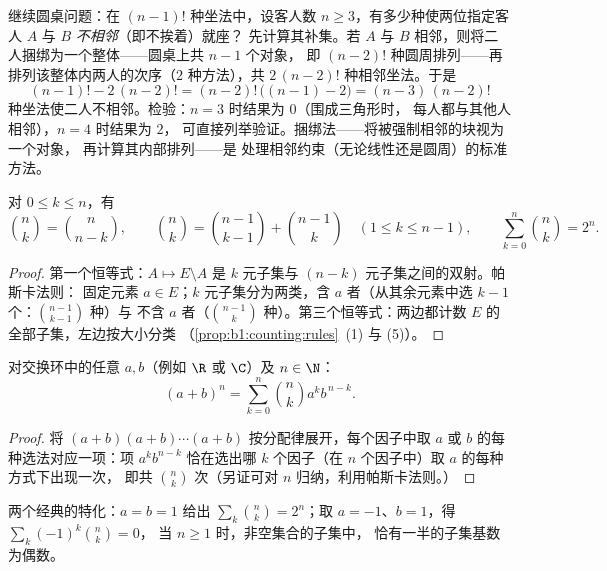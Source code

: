 \begin{example}[增加约束]\label{ex:b1:counting:constraint}
继续圆桌问题：在 $(n-1)!$ 种坐法中，设客人数 $n \geq
3$，有多少种使两位指定客人 $A$ 与 $B$ \emph{不相邻}（即不挨着）就座？
先计算其补集。若 $A$ 与 $B$
相邻，则将二人捆绑为一个整体——圆桌上共 $n - 1$ 个对象，
即 $(n-2)!$ 种圆周排列——再
排列该整体内两人的次序（$2$ 种方法），共 $2\,(n-2)!$
种相邻坐法。于是
\[
(n-1)! - 2\,(n-2)! = (n-2)!\,\bigl((n - 1) - 2\bigr)
= (n-3)\,(n-2)!
\]
种坐法使二人不相邻。检验：$n = 3$ 时结果为 $0$（围成三角形时，
每人都与其他人相邻），$n = 4$ 时结果为 $2$，
可直接列举验证。捆绑法——将被强制相邻的块视为一个对象，
再计算其内部排列——是
处理相邻约束（无论线性还是圆周）的标准方法。
\end{example}

\begin{proposition}[基本恒等式]\label{prop:b1:counting:identities}
对 $0 \leq k \leq n$，有
\[
\binom{n}{k} = \binom{n}{n-k},
\qquad
\binom{n}{k} = \binom{n-1}{k-1} + \binom{n-1}{k}
\quad (1 \leq k \leq n-1),
\qquad
\sum_{k=0}^{n} \binom{n}{k} = 2^n .
\]
\end{proposition}

\begin{proof}
第一个恒等式：$A \mapsto E \setminus A$ 是
$k$ 元子集与 $(n-k)$ 元子集之间的双射。帕斯卡法则：
固定元素 $a \in E$；$k$ 元子集分为两类，含
$a$ 者（从其余元素中选 $k - 1$ 个：$\binom{n-1}{k-1}$ 种）与
不含 $a$ 者（$\binom{n-1}{k}$ 种）。第三个恒等式：两边都计数
$E$ 的全部子集，左边按大小分类
（\cref{prop:b1:counting:rules}~(1) 与 (5)）。
\end{proof}

\begin{theorem}[二项式定理]\label{thm:b1:counting:binomial}
对交换环中的任意 $a, b$（例如 $\R$ 或 $\C$）及 $n \in \N$：
\[
(a + b)^n = \sum_{k=0}^{n} \binom{n}{k} a^k b^{\,n-k} .
\]
\end{theorem}

\begin{proof}
将 $(a+b)(a+b)\cdots(a+b)$ 按分配律展开，每个因子中取 $a$ 或 $b$
的每种选法对应一项：项 $a^k b^{n-k}$
恰在选出哪 $k$ 个因子（在 $n$ 个因子中）取 $a$ 的每种方式下出现一次，
即共 $\binom nk$ 次（另证可对
$n$ 归纳，利用帕斯卡法则。）
\end{proof}

\begin{example}\label{ex:b1:counting:binomial}
两个经典的特化：$a = b = 1$ 给出 $\sum_k \binom nk
= 2^n$；取 $a = -1$、$b = 1$，得 $\sum_{k} (-1)^k \binom nk = 0$，
当 $n \geq 1$ 时，非空集合的子集中，
恰有一半的子集基数为偶数。
\end{example}


